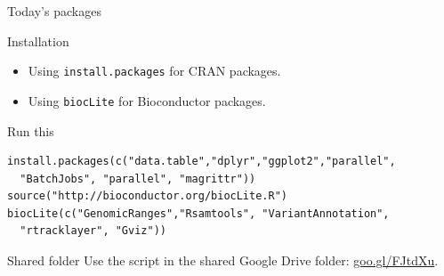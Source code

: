 \documentclass[10pt]{beamer}
\begin{document}
\begin{frame}[fragile, shrink=10]{Today's packages}
  \begin{alertblock}{Installation}
    \begin{itemize}
    \item Using \verb!install.packages! for CRAN packages.
    \item Using \verb!biocLite! for Bioconductor packages.
    \end{itemize}
  \end{alertblock}
  \begin{exampleblock}{Run this}
\begin{lstlisting}
install.packages(c("data.table","dplyr","ggplot2","parallel",
  "BatchJobs", "parallel", "magrittr"))
source("http://bioconductor.org/biocLite.R")
biocLite(c("GenomicRanges","Rsamtools", "VariantAnnotation",
  "rtracklayer", "Gviz"))
\end{lstlisting}
  \end{exampleblock}
  \begin{block}{Shared folder}
    Use the script in the shared Google Drive folder: \url{goo.gl/FJtdXu}.
  \end{block}
\end{frame}
\end{document}
